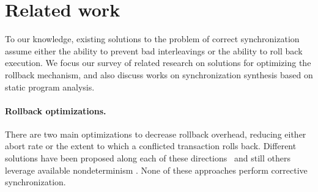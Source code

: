 \section{Related work}
To our knowledge, existing solutions to the problem of correct synchronization assume either the ability to prevent bad interleavings or the ability to roll back execution. We focus our survey of related research on solutions for optimizing the rollback mechanism, and also discuss works on synchronization synthesis based on static program analysis.

\paragraph{Rollback optimizations.}
There are two main optimizations to decrease rollback overhead,
reducing either abort rate or the extent to which a conflicted
transaction rolls back. Different solutions have been proposed along
each of these directions~\cite{ppopp/HerlihyK08,Galois,TYFS:OOPSLA11}
and still others leverage available nondeterminism
\cite{TKS:OOPSLA13}. None of these approaches perform corrective
synchronization.
%
%
%
%
%
